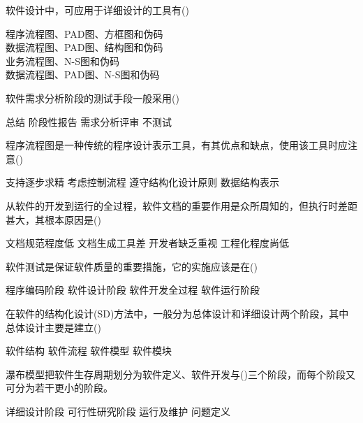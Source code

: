 \documentclass[answers]{exam}
\begin{document}
\begin{questions}
\begin{oneparchoices}
	\end{oneparchoices}
	\question 软件设计中，可应用于详细设计的工具有()\\
	\begin{oneparchoices}
		\choice 程序流程图、PAD图、方框图和伪码\\
		\choice 数据流程图、PAD图、结构图和伪码\\
		\choice 业务流程图、N-S图和伪码\\
		\choice 数据流程图、PAD图、N-S图和伪码
	\end{oneparchoices}
	\question 软件需求分析阶段的测试手段一般采用()\\
	\begin{oneparchoices}
		\choice 总结
		\choice 阶段性报告
		\choice 需求分析评审
		\choice 不测试
	\end{oneparchoices}
	\question 程序流程图是一种传统的程序设计表示工具，有其优点和缺点，使用该工具时应注意()\\
	\begin{oneparchoices}
		\choice 支持逐步求精
		\choice 考虑控制流程
		\choice 遵守结构化设计原则
		\choice 数据结构表示
	\end{oneparchoices}
	\question 从软件的开发到运行的全过程，软件文档的重要作用是众所周知的，但执行时差距甚大，其根本原因是()\\
	\begin{oneparchoices}
		\choice 文档规范程度低
		\choice 文档生成工具差
		\choice 开发者缺乏重视
		\choice 工程化程度尚低
	\end{oneparchoices}
	\question 软件测试是保证软件质量的重要措施，它的实施应该是在()\\
	\begin{oneparchoices}
		\choice 程序编码阶段
		\choice 软件设计阶段
		\choice 软件开发全过程
		\choice 软件运行阶段
	\end{oneparchoices}
	\question 在软件的结构化设计(SD)方法中，一般分为总体设计和详细设计两个阶段，其中总体设计主要是建立()\\
	\begin{oneparchoices}
		\choice 软件结构
		\choice 软件流程
		\choice 软件模型
		\choice 软件模块
	\end{oneparchoices}
	\question 瀑布模型把软件生存周期划分为软件定义、软件开发与()三个阶段，而每个阶段又可分为若干更小的阶段。\\
	\begin{oneparchoices}
		\choice 详细设计阶段
		\choice 可行性研究阶段
		\choice 运行及维护
		\choice 问题定义
	\end{oneparchoices}

\end{questions}
\end{document}
